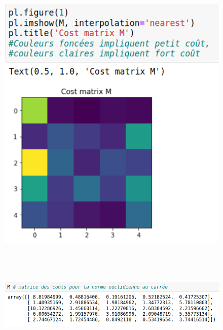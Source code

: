 \documentclass{beamer}
\theoremstyle{definition}
\begin{document}
\begin{frame}
	\begin{minipage}[t]{1\linewidth}
		\begin{minipage}{0.4\linewidth}\centering\begin{figure}
				\centering
				\includegraphics[scale= 0.5]{a4.png}
		\end{figure}\end{minipage}\quad \  
		\begin{minipage}{0.43\linewidth}\centering\begin{figure}
				\hfill\\[3cm]
				\includegraphics[scale= 0.25]{a3.png}		
		\end{figure}\end{minipage}
	\end{minipage}
\end{frame}
\end{document}
